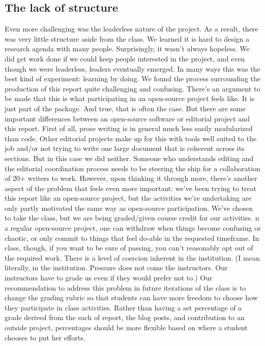 \subsection{The lack of structure}
Even more challenging was the leaderless nature of the project. As a result, there was very little structure aside from the class. We learned it is hard to design a research agenda with many people. 
Surprisingly, it wasn't always hopeless. We did get work done if we could keep people interested in the project, and even though we were leaderless, leaders eventually emerged. In many ways this was the best kind of experiment: learning by doing.  
We found the process surrounding the production of this report quite challenging and confusing. There's an argument to be made that this is what participating in an open-source project feels like. It is just part of the package. And true, that is often the case. But there are some important differences between an open-source software or editorial project and this report. First of all, prose writing is in general much less easily modularized than code. Other editorial projects make up for this with tools well suited to the job and/or not trying to write one large document that is coherent across its sections. But in this case we did neither. 
Someone who understands editing and the editorial coordination process needs to be steering the ship for a collaboration of 20+ writers to work. However, upon thinking it through more, there's another aspect of the problem that feels even more important: we've been trying to treat this report like an open-source project, but the activities we're undertaking are only partly motivated the same way as open-source participation. We've chosen to take the class, but we are being graded/given course credit for our activities. n a regular open-source project, one can withdraw when things become confusing or chaotic, or only commit to things that feel do-able in the requested timeframe. 
In class, though, if you want to be sure of passing, you can't reasonably opt out of the required work. There is a level of coercion inherent in the institution. (I mean literally, in the institution. Pressure does not come the instructors. Our instructors have to grade us even if they would prefer not to.) Our recommendation to address this problem in future iterations of the class is to change the grading rubric so that students can have more freedom to choose how they participate in class activities. Rather than having a set percentage of a grade derived from the each of report, the blog posts, and contribution to an outside project, percentages should be more flexible based on where a student chooses to put her efforts. 
